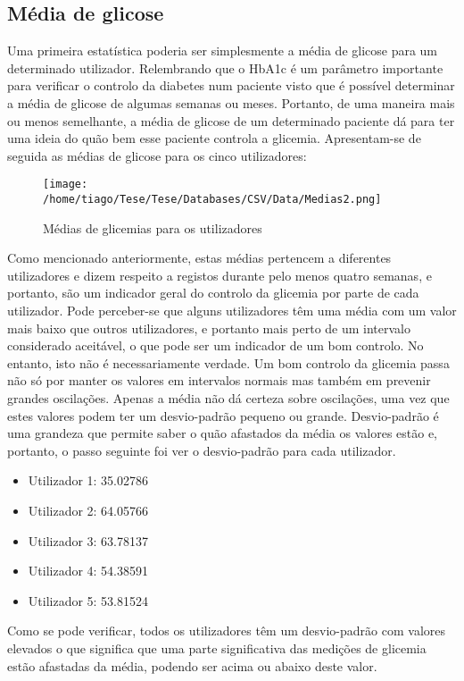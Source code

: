\subsection{Média de glicose}

Uma primeira estatística poderia ser simplesmente a média de glicose para um determinado utilizador. Relembrando que o HbA1c é um parâmetro importante para verificar o controlo da diabetes num paciente visto que é possível determinar a média de glicose de algumas semanas ou meses. Portanto, de uma maneira mais ou menos semelhante, a média de glicose de um determinado paciente dá para ter uma ideia do quão bem esse paciente controla a glicemia. Apresentam-se de seguida as médias de glicose para os cinco utilizadores:

\begin{figure}[H]
\centering
\texttt{[image: /home/tiago/Tese/Tese/Databases/CSV/Data/Medias2.png]}
\caption{Médias de glicemias para os utilizadores}
\label{fig:medias1}
\end{figure}
Como mencionado anteriormente, estas médias pertencem a diferentes utilizadores e dizem respeito a registos durante pelo menos quatro semanas, e portanto, são um indicador geral do controlo da glicemia por parte de cada utilizador. Pode perceber-se que alguns utilizadores têm uma média com um valor mais baixo que outros utilizadores, e portanto mais perto de um intervalo considerado aceitável, o que pode ser um indicador de um bom controlo. No entanto, isto não é necessariamente verdade. Um bom controlo da glicemia passa não só por manter os valores em intervalos normais mas também em prevenir grandes oscilações. Apenas a média não dá certeza sobre oscilações, uma vez que estes valores podem ter um desvio-padrão pequeno ou grande. Desvio-padrão é uma grandeza que permite saber o quão afastados da média os valores estão e, portanto, o passo seguinte foi ver o desvio-padrão para cada utilizador.

\begin{itemize}
\item Utilizador 1: 35.02786
\item Utilizador 2: 64.05766
\item Utilizador 3: 63.78137
\item Utilizador 4: 54.38591
\item Utilizador 5: 53.81524
\end{itemize}
Como se pode verificar, todos os utilizadores têm um desvio-padrão com valores elevados o que significa que uma parte significativa das medições de glicemia estão afastadas da média, podendo ser acima ou abaixo deste valor.

